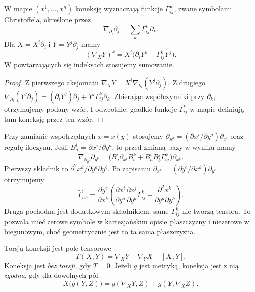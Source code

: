 \begin{stwierdzenie}
\label{prop:koneksja-lokalna}
W mapie $(x^1,\ldots,x^n)$ koneksję wyznaczają
funkcje $\Gamma^k_{ij}$, zwane symbolami Christoffela,
określone przez
\begin{equation}\label{eq:def-christoffel}
 \nabla_{\partial_i}\partial_j
   =\sum_k\Gamma^k_{ij}\partial_k.
\end{equation}
Dla $X=X^i\partial_i$ i $Y=Y^j\partial_j$ mamy
\begin{equation}\label{eq:koneksja-wspolrzedne}
 (\nabla_XY)^k=X^i\bigl(\partial_iY^k+
                         \Gamma^k_{ij}Y^j\bigr).
\end{equation}
W powtarzających się indeksach stosujemy sumowanie.
\end{stwierdzenie}
\begin{proof}
Z pierwszego aksjomatu
$\nabla_XY=X^i\nabla_{\partial_i}(Y^j\partial_j)$.
Z drugiego
$\nabla_{\partial_i}(Y^j\partial_j)
=(\partial_iY^j)\partial_j
 +Y^j\Gamma^k_{ij}\partial_k$.
Zbierając współczynniki przy $\partial_k$,
otrzymujemy podany wzór. I odwrotnie:
gładkie funkcje $\Gamma^k_{ij}$ w mapie definiują
tam koneksję przez ten wzór.
\end{proof}

\begin{uwaga}
\label{uw:symbole-nie-tensor}
Przy zamianie współrzędnych $x=x(y)$ stosujemy
$\partial_{y^a}=(\partial x^i/\partial y^a)\partial_{x^i}$
oraz regułę iloczynu. Jeśli $B^i_a=\partial x^i/\partial y^a$,
to przed zmianą bazy w wyniku mamy
\[
 \nabla_{\partial_{y^a}}\partial_{y^b}
 =\bigl(B^i_a\partial_{x^i}B^k_b
       +B^i_aB^j_b\Gamma^k_{ij}\bigr)\partial_{x^k}.
\]
Pierwszy składnik to $\partial^2x^k/\partial y^a\partial y^b$.
Po zapisaniu $\partial_{x^k}=(\partial y^c/\partial x^k)
\partial_{y^c}$ otrzymujemy
\begin{equation}\label{eq:transformacja-christoffel}
 \widetilde\Gamma^c_{ab}
 =\frac{\partial y^c}{\partial x^k}
  \left(
   \frac{\partial x^i}{\partial y^a}
   \frac{\partial x^j}{\partial y^b}\Gamma^k_{ij}
   +\frac{\partial^2x^k}{\partial y^a\partial y^b}
  \right).
\end{equation}
Druga pochodna jest dodatkowym składnikiem;
same $\Gamma^k_{ij}$ nie tworzą tensora.
To pozwala mieć zerowe symbole w kartezjańskim
opisie płaszczyzny i niezerowe w biegunowym,
choć geometrycznie jest to ta sama płaszczyzna.
\end{uwaga}

\begin{definicja}
\label{def:torsja-koneksja}
Torsją koneksji jest pole tensorowe
\[
 T(X,Y)=\nabla_XY-\nabla_YX-[X,Y].
\]
Koneksja jest \emph{bez torsji}, gdy $T=0$.
Jeżeli $g$ jest metryką, koneksja jest z nią
\emph{zgodna}, gdy dla dowolnych pól
\begin{equation}\label{eq:zgodnosc-metryczna}
 X\bigl(g(Y,Z)\bigr)
 =g(\nabla_XY,Z)+g(Y,\nabla_XZ).
\end{equation}
\end{definicja}

